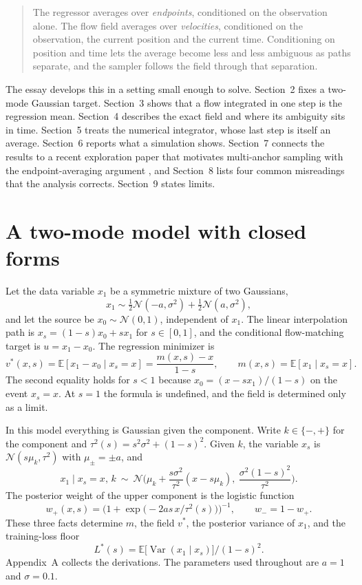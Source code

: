 \documentclass[11pt]{article}
\theoremstyle{definition}
\newcommand{\E}{\mathbb{E}}
\newcommand{\Var}{\operatorname{Var}}
\newcommand{\N}{\mathcal{N}}
\begin{document}
\begin{quote}
The regressor averages over \emph{endpoints}, conditioned on the observation alone. The flow field averages over \emph{velocities}, conditioned on the observation, the current position and the current time. Conditioning on position and time lets the average become less and less ambiguous as paths separate, and the sampler follows the field through that separation.
\end{quote}

The essay develops this in a setting small enough to solve. Section~2 fixes a two-mode Gaussian target. Section~3 shows that a flow integrated in one step is the regression mean. Section~4 describes the exact field and where its ambiguity sits in time. Section~5 treats the numerical integrator, whose last step is itself an average. Section~6 reports what a simulation shows. Section~7 connects the results to a recent exploration paper that motivates multi-anchor sampling with the endpoint-averaging argument \citep{li2026}, and Section~8 lists four common misreadings that the analysis corrects. Section~9 states limits.

\section{A two-mode model with closed forms}

Let the data variable $x_1$ be a symmetric mixture of two Gaussians,
\[
x_1\sim \tfrac12\N(-a,\sigma^2)+\tfrac12\N(a,\sigma^2),
\]
and let the source be $x_0\sim\N(0,1)$, independent of $x_1$. The linear interpolation path is $x_s=(1-s)x_0+s x_1$ for $s\in[0,1]$, and the conditional flow-matching target is $u=x_1-x_0$. The regression minimizer is
\[
v^\ast(x,s)=\E[x_1-x_0\mid x_s=x]=\frac{m(x,s)-x}{1-s},\qquad m(x,s)=\E[x_1\mid x_s=x].
\]
The second equality holds for $s<1$ because $x_0=(x-s x_1)/(1-s)$ on the event $x_s=x$. At $s=1$ the formula is undefined, and the field is determined only as a limit.

In this model everything is Gaussian given the component. Write $k\in\{-,+\}$ for the component and $\tau^2(s)=s^2\sigma^2+(1-s)^2$. Given $k$, the variable $x_s$ is $\N(s\mu_k,\tau^2)$ with $\mu_\pm=\pm a$, and
\[
x_1\mid x_s=x,\,k\ \sim\ \N\!\Big(\mu_k+\frac{s\sigma^2}{\tau^2}(x-s\mu_k),\ \frac{\sigma^2(1-s)^2}{\tau^2}\Big).
\]
The posterior weight of the upper component is the logistic function
\[
w_+(x,s)=\Big(1+\exp\!\big(-2as\,x/\tau^2(s)\big)\Big)^{-1},\qquad w_-=1-w_+ .
\]
These three facts determine $m$, the field $v^\ast$, the posterior variance of $x_1$, and the training-loss floor
\[
L^\ast(s)=\E\big[\Var(x_1\mid x_s)\big]/(1-s)^2 .
\]
Appendix~A collects the derivations. The parameters used throughout are $a=1$ and $\sigma=0.1$.
\end{document}
